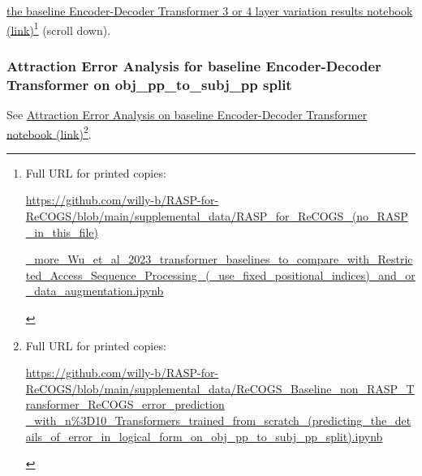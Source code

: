 \documentclass[11pt]{article}
\begin{document}
\href{https://github.com/willy-b/RASP-for-ReCOGS/blob/main/supplemental\_data/RASP\_for\_ReCOGS\_(no\_RASP\_in\_this\_file)\_more\_Wu\_et\_al\_2023\_transformer\_baselines\_to\_compare\_with\_Restricted\_Access\_Sequence\_Processing\_(\_use\_fixed\_positional\_indices)\_and\_or\_data\_augmentation.ipynb}{the baseline Encoder-Decoder Transformer 3 or 4 layer variation results notebook (link)}\footnote{\begin{tiny}Full URL for printed copies: 

\href{https://github.com/willy-b/RASP-for-ReCOGS/blob/main/supplemental\_data/RASP\_for\_ReCOGS\_(no\_RASP\_in\_this\_file)\_more\_Wu\_et\_al\_2023\_transformer\_baselines\_to\_compare\_with\_Restricted\_Access\_Sequence\_Processing\_(\_use\_fixed\_positional\_indices)\_and\_or\_data\_augmentation.ipynb}{https://github.com/willy-b/RASP-for-ReCOGS/blob/main/supplemental\_data/RASP\_for\_ReCOGS\_(no\_RASP\_in\_this\_file)}

\href{https://github.com/willy-b/RASP-for-ReCOGS/blob/main/supplemental\_data/RASP\_for\_ReCOGS\_(no\_RASP\_in\_this\_file)\_more\_Wu\_et\_al\_2023\_transformer\_baselines\_to\_compare\_with\_Restricted\_Access\_Sequence\_Processing\_(\_use\_fixed\_positional\_indices)\_and\_or\_data\_augmentation.ipynb}{\_more\_Wu\_et\_al\_2023\_transformer\_baselines\_to\_compare\_with\_Restricted\_Access\_Sequence\_Processing\_(\_use\_fixed\_positional\_indices)\_and\_or\_data\_augmentation.ipynb}\end{tiny}} (scroll down).

\subsubsection{Attraction Error Analysis for \citep{Wu2023} baseline Encoder-Decoder Transformer on obj\_pp\_to\_subj\_pp split}

See \href{https://github.com/willy-b/RASP-for-ReCOGS/blob/main/supplemental\_data/ReCOGS\_Baseline\_non\_RASP\_Transformer\_ReCOGS\_error\_prediction\_with\_n\%3D10\_Transformers\_trained\_from\_scratch\_(predicting\_the\_details\_of\_error\_in\_logical\_form\_on\_obj\_pp\_to\_subj\_pp\_split).ipynb}{Attraction Error Analysis on baseline Encoder-Decoder Transformer notebook (link)}\footnote{\begin{tiny}Full URL for printed copies: 

\href{https://github.com/willy-b/RASP-for-ReCOGS/blob/main/supplemental\_data/ReCOGS\_Baseline\_non\_RASP\_Transformer\_ReCOGS\_error\_prediction\_with\_n\%3D10\_Transformers\_trained\_from\_scratch\_(predicting\_the\_details\_of\_error\_in\_logical\_form\_on\_obj\_pp\_to\_subj\_pp\_split).ipynb}{https://github.com/willy-b/RASP-for-ReCOGS/blob/main/supplemental\_data/ReCOGS\_Baseline\_non\_RASP\_Transformer\_ReCOGS\_error\_prediction
\_with\_n\%3D10\_Transformers\_trained\_from\_scratch\_(predicting\_the\_details\_of\_error\_in\_logical\_form\_on\_obj\_pp\_to\_subj\_pp\_split).ipynb}\end{tiny}}.
\end{document}
